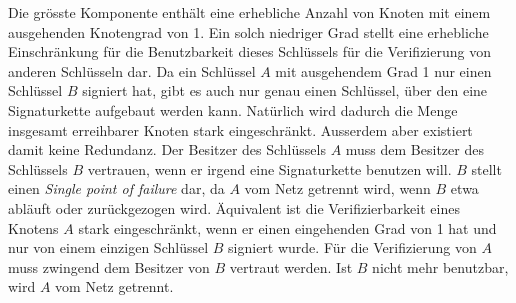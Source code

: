 Die gr\"osste Komponente enth\"alt eine erhebliche Anzahl von Knoten
mit einem ausgehenden Knotengrad von 1. Ein solch niedriger Grad
stellt eine erhebliche Einschr\"ankung f\"ur die Benutzbarkeit dieses
Schl\"ussels f\"ur die Verifizierung von anderen Schl\"usseln dar. Da
ein Schl\"ussel $A$ mit ausgehendem Grad 1 nur einen Schl\"ussel $B$
signiert hat, gibt es auch nur genau einen Schl\"ussel, \"uber den
eine Signaturkette aufgebaut werden kann. Nat\"urlich wird dadurch die
Menge insgesamt erreihbarer Knoten stark eingeschr\"ankt. Ausserdem
aber existiert damit keine Redundanz. Der Besitzer des Schl\"ussels
$A$ muss dem Besitzer des Schl\"ussels $B$ vertrauen, wenn er irgend
eine Signaturkette benutzen will. $B$ stellt einen \emph{Single point
  of failure} dar, da $A$ vom Netz getrennt wird, wenn $B$ etwa
abl\"auft oder zur\"uckgezogen wird. \"Aquivalent ist die
Verifizierbarkeit eines Knotens $A$ stark eingeschr\"ankt, wenn er
einen eingehenden Grad von 1 hat und nur von einem einzigen
Schl\"ussel $B$ signiert wurde. F\"ur die Verifizierung von $A$ muss
zwingend dem Besitzer von $B$ vertraut werden. Ist $B$ nicht mehr
benutzbar, wird $A$ vom Netz getrennt.
